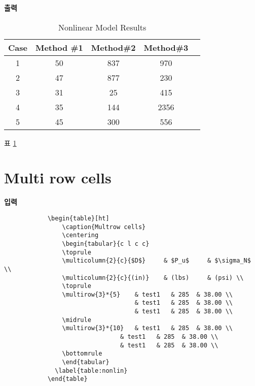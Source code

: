 	\textbf{출력}
				\begin{table}[ht]
					\caption{Nonlinear Model Results}
					\centering
					\begin{tabular}{c c c c c}
					\toprule
					Case & Method \#1 & Method\#2 & Method\#3 \\ [0.5ex]
					\midrule
					1   & 50   & 837  & 970 \\
					2   & 47   & 877  & 230 \\
				    3   & 31   & 25   & 415  \\
				    4   & 35   & 144  & 2356 \\
				    5   & 45   & 300  & 556  \\ [1ex]
				    \bottomrule
				    \end{tabular}%
				  \label{table:nonlin}%
				\end{table}
				
		표 \ref{table:nonlin}
		

%
%
\newpage  
\section{Multi row cells}
\null
	\singlespacing
	\textbf{입력}\\
		\begin{boxedminipage}[t]{1.0\linewidth}
		\small
		\begin{verbatim}
			\begin{table}[ht]
				\caption{Multrow cells}
				\centering
			    \begin{tabular}{c l c c}
			    \toprule
				\multicolumn{2}{c}{$D$} 	& $P_u$ 	& $\sigma_N$ \\
				\multicolumn{2}{c}{(in)} 	& (lbs) 	& (psi) \\
			    \toprule
			    \multirow{3}*{5}  	& test1   & 285  & 38.00 \\
							    	& test1   & 285  & 38.00 \\
							    	& test1   & 285  & 38.00 \\
			    \midrule
			    \multirow{3}*{10}	& test1   & 285  & 38.00 \\
								& test1   & 285  & 38.00 \\
								& test1   & 285  & 38.00 \\
			    \bottomrule
			    \end{tabular}
			  \label{table:nonlin}
			\end{table}
		\end{verbatim} 
		\end{boxedminipage} \\ \\
		
